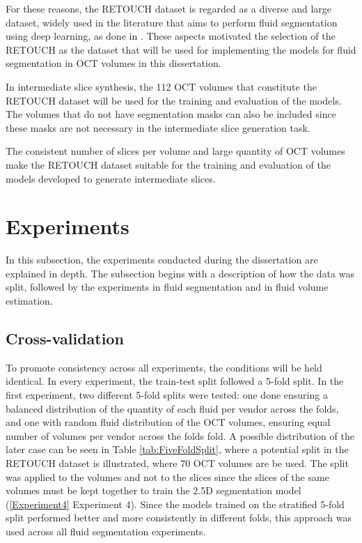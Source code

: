 \par
For these reasons, the RETOUCH dataset is regarded as a diverse and large dataset, widely used in the literature that aims to perform fluid segmentation using deep learning, as done in \parencite{Rahil2023, Zhang2023, Xing2022, Tang2022, Liu2024, Li2023, Hassan2021b, Lu2019}. These aspects motivated the selection of the RETOUCH as the dataset that will be used for implementing the models for fluid segmentation in OCT volumes in this dissertation.
\par
In intermediate slice synthesis, the 112 OCT volumes that constitute the RETOUCH dataset will be used for the training and evaluation of the models. The volumes that do not have segmentation masks can also be included since these masks are not necessary in the intermediate slice generation task.
\par
The consistent number of slices per volume and large quantity of OCT volumes make the RETOUCH dataset suitable for the training and evaluation of the models developed to generate intermediate slices.

\section{Experiments}\label{Experiments}
In this subsection, the experiments conducted during the dissertation are explained in depth. The subsection begins with a description of how the data was split, followed by the experiments in fluid segmentation and in fluid volume estimation.

\subsection{Cross-validation}\label{CrossValidation}
To promote consistency across all experiments, the conditions will be held identical. In every experiment, the train-test split followed a 5-fold split. In the first experiment, two different 5-fold splits were tested: one done ensuring a balanced distribution of the quantity of each fluid per vendor across the folds, and one with random fluid distribution of the OCT volumes, ensuring equal number of volumes per vendor across the folds fold. A possible distribution of the later case can be seen in Table \ref{tab:FiveFoldSplit}, where a potential split in the RETOUCH dataset is illustrated, where 70 OCT volumes are be used. The split was applied to the volumes and not to the slices since the slices of the same volumes must be kept together to train the 2.5D segmentation model (\ref{Experiment4} Experiment 4). Since the models trained on the stratified 5-fold split performed better and more consistently in different folds, this approach was used across all fluid segmentation experiments.

